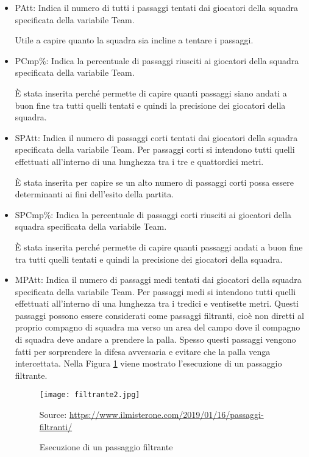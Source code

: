\begin{itemize}
	
	
	\item \textsf{PAtt}: Indica il numero di tutti i passaggi tentati dai giocatori della squadra specificata della variabile \textsf{Team}. 
	
	Utile a capire quanto la squadra sia incline a tentare i passaggi.
	
	\item\textsf{PCmp\%}: Indica la percentuale di passaggi riusciti ai giocatori della squadra specificata della variabile \textsf{Team}. 
	
	È stata inserita perché permette di capire quanti passaggi siano andati a buon fine tra tutti quelli tentati e quindi la precisione dei giocatori della squadra.
	\item \textsf{SPAtt}: Indica il numero di passaggi corti tentati dai giocatori della squadra specificata della variabile \textsf{Team}. Per passaggi corti si intendono tutti quelli effettuati all'interno di una lunghezza tra i tre e quattordici metri.
	
	È stata inserita per capire se un alto numero di passaggi corti possa essere determinanti ai fini dell'esito della partita. 
	
	\item \textsf{SPCmp\%}: Indica la percentuale di passaggi corti riusciti ai giocatori della squadra specificata della variabile \textsf{Team}. 
	
	È stata inserita perché permette di capire quanti passaggi andati a buon fine tra tutti quelli tentati e quindi la precisione dei giocatori della squadra.
	
	\item \textsf{MPAtt}: Indica il numero di passaggi medi tentati dai giocatori della squadra specificata della variabile \textsf{Team}. Per passaggi medi si intendono tutti quelli effettuati all'interno di una lunghezza tra i tredici e ventisette metri. Questi passaggi possono essere considerati come passaggi filtranti, cioè non diretti al proprio compagno di squadra ma verso un area del campo dove il compagno di squadra deve andare a prendere la palla. Spesso questi passaggi vengono fatti per sorprendere la difesa avversaria e evitare che la palla venga intercettata. Nella Figura \ref{fig:filt} viene mostrato l'esecuzione di un passaggio filtrante.
	
	\begin{figure}[ht]
		\begin{center}
			\texttt{[image: filtrante2.jpg]}
			\caption{Esecuzione di un passaggio filtrante} \label{fig:filt}
			Source: \url{https://www.ilmisterone.com/2019/01/16/passaggi-filtranti/}
		\end{center}
	\end{figure}


\end{itemize}
